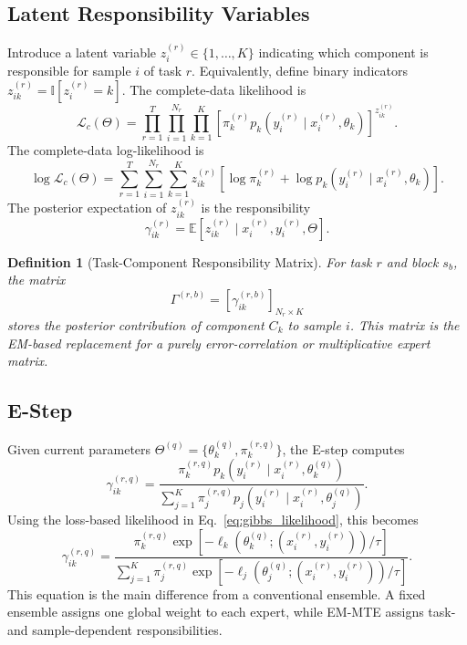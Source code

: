 ﻿\documentclass[12pt,a4paper]{article}
\newtheorem{definition}{Definition}
\newcommand{\E}{\mathbb{E}}
\newcommand{\calL}{\mathcal{L}}
\begin{document}
\subsection{Latent Responsibility Variables}
Introduce a latent variable $z_i^{(r)}\in\{1,\ldots,K\}$ indicating which
component is responsible for sample $i$ of task $r$. Equivalently, define
binary indicators $z_{ik}^{(r)}=\mathbb{I}[z_i^{(r)}=k]$. The complete-data
likelihood is
\begin{equation}
\calL_c(\Theta)=
\prod_{r=1}^{T}\prod_{i=1}^{N_r}\prod_{k=1}^{K}
\left[
\pi_k^{(r)}p_k(y_i^{(r)}\mid x_i^{(r)},\theta_k)
\right]^{z_{ik}^{(r)}}.
\label{eq:complete_likelihood}
\end{equation}
The complete-data log-likelihood is
\begin{equation}
\log\calL_c(\Theta)=
\sum_{r=1}^{T}\sum_{i=1}^{N_r}\sum_{k=1}^{K}
z_{ik}^{(r)}
\left[
\log\pi_k^{(r)}+
\log p_k(y_i^{(r)}\mid x_i^{(r)},\theta_k)
\right].
\label{eq:complete_log_likelihood}
\end{equation}
The posterior expectation of $z_{ik}^{(r)}$ is the responsibility
\begin{equation}
\gamma_{ik}^{(r)} = \E[z_{ik}^{(r)}\mid x_i^{(r)},y_i^{(r)},\Theta].
\end{equation}

\begin{definition}[Task-Component Responsibility Matrix]
For task $r$ and block $s_b$, the matrix
\begin{equation}
\Gamma^{(r,b)}=\left[\gamma_{ik}^{(r,b)}\right]_{N_r\times K}
\end{equation}
stores the posterior contribution of component $C_k$ to sample $i$. This
matrix is the EM-based replacement for a purely error-correlation or
multiplicative expert matrix.
\end{definition}

\subsection{E-Step}
Given current parameters $\Theta^{(q)}=\{\theta_k^{(q)},\pi_k^{(r,q)}\}$, the
E-step computes
\begin{equation}
\gamma_{ik}^{(r,q)}=
\frac{
\pi_k^{(r,q)}p_k(y_i^{(r)}\mid x_i^{(r)},\theta_k^{(q)})
}{
\sum_{j=1}^{K}\pi_j^{(r,q)}p_j(y_i^{(r)}\mid x_i^{(r)},\theta_j^{(q)})
}.
\label{eq:e_step}
\end{equation}
Using the loss-based likelihood in Eq.~\eqref{eq:gibbs_likelihood}, this
becomes
\begin{equation}
\gamma_{ik}^{(r,q)}=
\frac{
\pi_k^{(r,q)}\exp[-\ell_k(\theta_k^{(q)};(x_i^{(r)},y_i^{(r)}))/\tau]
}{
\sum_{j=1}^{K}\pi_j^{(r,q)}\exp[-\ell_j(\theta_j^{(q)};(x_i^{(r)},y_i^{(r)}))/\tau]
}.
\label{eq:e_step_loss}
\end{equation}
This equation is the main difference from a conventional ensemble. A fixed
ensemble assigns one global weight to each expert, while EM-MTE assigns
task- and sample-dependent responsibilities.
\end{document}
